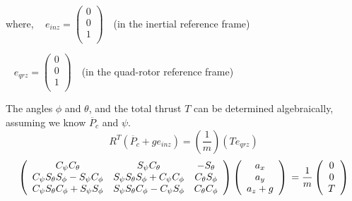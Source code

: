 where,
\mbox{ } \hspace{.5in} $ e_{inz} = \left( \begin{array}{c}
0\\0\\1\\
\end{array}\right) \text{  }$ (in the inertial reference frame)

\mbox{ } \hspace{.5in} $ e_{qrz} = \left( \begin{array}{c}
0\\0\\1\\
\end{array}\right) \text{  }$  (in the quad-rotor reference frame)

The angles $\phi$ and $\theta$, and the total thrust $T$ can be determined algebraically, assuming we know $\ddot{P_c}$ and $\psi$.\\

\begin{equation}
    \label{eq:thrustTransformation}
    R^T \left( \ddot{P_c} + g e_{inz}\right) = \left(\frac{1}{m}\right) \left(T e_{qrz}\right)
\end{equation}
\begin{equation}
    \left( \begin{array}{ccc}
        C_{\psi} C_{\theta} & S_{\psi} C_{\theta} & -S_{\theta}\\
        C_{\psi} S_{\theta} S_{\phi} - S_{\psi} C_{\phi} & S_{\psi} S_{\theta} S_{\phi} + C_{\psi} C_{\phi} & C_{\theta} S_{\phi}\\
        C_{\psi} S_{\theta} C_{\phi} + S_{\psi} S_{\phi} & S_{\psi} S_{\theta} C_{\phi} - C_{\psi} S_{\phi} & C_{\theta} C_{\phi}\\
    \end{array} \right)\left( \begin{array}{c} a_x\\a_y\\a_z+g\\\end{array} \right)\\
    = \frac{1}{m} \left( \begin{array}{c} 0\\0\\T\\ \end{array} \right)
\end{equation}

